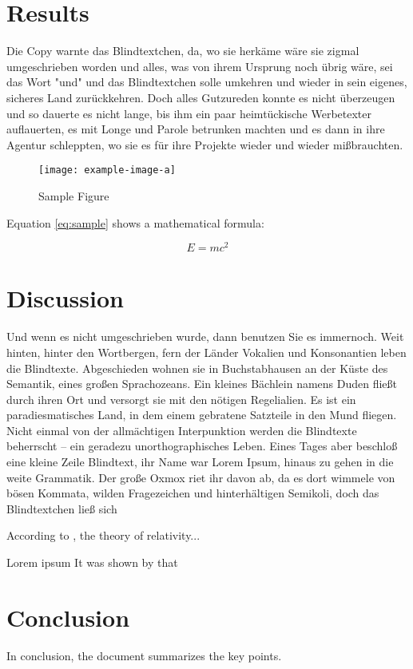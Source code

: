 \documentclass[12pt,a4paper]{article}
\begin{document}
\section{Results}

 Die Copy warnte das Blindtextchen, da, wo sie herkäme wäre sie zigmal umgeschrieben worden und alles, was von ihrem Ursprung noch übrig wäre, sei das Wort "und" und das Blindtextchen solle umkehren und wieder in sein eigenes, sicheres Land zurückkehren. Doch alles Gutzureden konnte es nicht überzeugen und so dauerte es nicht lange, bis ihm ein paar heimtückische Werbetexter auflauerten, es mit Longe und Parole betrunken machten und es dann in ihre Agentur schleppten, wo sie es für ihre Projekte wieder und wieder mißbrauchten.

\begin{figure}[h]
\centering
\texttt{[image: example-image-a]}
\caption{Sample Figure}
\label{fig:sample}
\end{figure}

Equation \ref{eq:sample} shows a mathematical formula:

\begin{equation}
\label{eq:sample}
E=mc^2
\end{equation}

\section{Discussion}

 Und wenn es nicht umgeschrieben wurde, dann benutzen Sie es immernoch. Weit hinten, hinter den Wortbergen, fern der Länder Vokalien und Konsonantien leben die Blindtexte. Abgeschieden wohnen sie in Buchstabhausen an der Küste des Semantik, eines großen Sprachozeans. Ein kleines Bächlein namens Duden fließt durch ihren Ort und versorgt sie mit den nötigen Regelialien. Es ist ein paradiesmatisches Land, in dem einem gebratene Satzteile in den Mund fliegen. Nicht einmal von der allmächtigen Interpunktion werden die Blindtexte beherrscht – ein geradezu unorthographisches Leben. Eines Tages aber beschloß eine kleine Zeile Blindtext, ihr Name war Lorem Ipsum, hinaus zu gehen in die weite Grammatik. Der große Oxmox riet ihr davon ab, da es dort wimmele von bösen Kommata, wilden Fragezeichen und hinterhältigen Semikoli, doch das Blindtextchen ließ sich 

According to \cite{einstein}, the theory of relativity...

Lorem \autocite{knuth1984}
ipsum \parencite{lshort}
It was shown by \textcite{lamport1994} that

\section{Conclusion}
In conclusion, the document summarizes the key points.

\newpage

\printbibliography[title={Literaturverzeichnis}]
\end{document}
